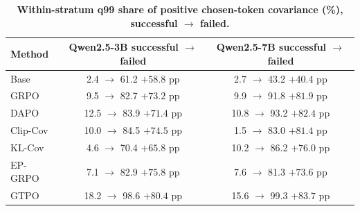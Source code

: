 \documentclass[letterpaper]{article} %
\begin{document}
\begin{table}[t]
    \centering
    \small
    \setlength{\tabcolsep}{3.2pt}
    \renewcommand{\arraystretch}{1.08}
    \begin{tabular*}{\columnwidth}{@{\extracolsep{\fill}}lcc@{}}
        \toprule
        Method &
        \shortstack{Qwen2.5-3B\\[-1pt]\scriptsize successful \(\rightarrow\) failed} &
        \shortstack{Qwen2.5-7B\\[-1pt]\scriptsize successful \(\rightarrow\) failed} \\
        \midrule
        Base     & \shortstack{2.4 \(\rightarrow\) 61.2\\[-1pt]\scriptsize \(+58.8\) pp} & \shortstack{2.7 \(\rightarrow\) 43.2\\[-1pt]\scriptsize \(+40.4\) pp} \\
        GRPO     & \shortstack{9.5 \(\rightarrow\) 82.7\\[-1pt]\scriptsize \(+73.2\) pp} & \shortstack{9.9 \(\rightarrow\) 91.8\\[-1pt]\scriptsize \(+81.9\) pp} \\
        DAPO     & \shortstack{12.5 \(\rightarrow\) 83.9\\[-1pt]\scriptsize \(+71.4\) pp} & \shortstack{10.8 \(\rightarrow\) 93.2\\[-1pt]\scriptsize \(+82.4\) pp} \\
        Clip-Cov & \shortstack{10.0 \(\rightarrow\) 84.5\\[-1pt]\scriptsize \(+74.5\) pp} & \shortstack{1.5 \(\rightarrow\) 83.0\({}\)\\[-1pt]\scriptsize \(+81.4\) pp} \\
        KL-Cov   & \shortstack{4.6 \(\rightarrow\) 70.4\\[-1pt]\scriptsize \(+65.8\) pp} & \shortstack{10.2 \(\rightarrow\) 86.2\\[-1pt]\scriptsize \(+76.0\) pp} \\
        EP-GRPO  & \shortstack{7.1 \(\rightarrow\) 82.9\\[-1pt]\scriptsize \(+75.8\) pp} & \shortstack{7.6 \(\rightarrow\) 81.3\\[-1pt]\scriptsize \(+73.6\) pp} \\
        GTPO     & \shortstack{18.2 \(\rightarrow\) 98.6\\[-1pt]\scriptsize \(+80.4\) pp} & \shortstack{15.6 \(\rightarrow\) 99.3\\[-1pt]\scriptsize \(+83.7\) pp} \\
        \bottomrule
    \end{tabular*}
    \caption{\textbf{Within-stratum q99 share of positive chosen-token covariance (\%), successful \(\rightarrow\) failed.}}
    \label{tab:covariance-tail}
\end{table}
\end{document}
